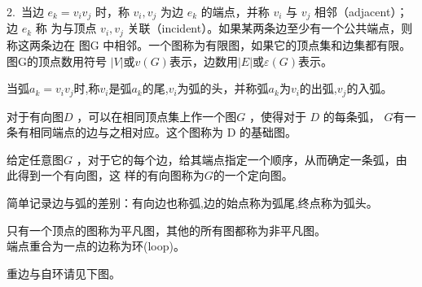 \documentclass[a4paper,20pt]{article}
\begin{document}
\par 2.~当边 $e_k=v_iv_j$ 时，称 $v_i,v_j$ 为边 $e_k$ 的端点，并称 $v_i$ 与 $v_j$ 相邻（adjacent）；边 $e_k$ 称
为与顶点 $v_i,v_j$ 关联（incident）。如果某两条边至少有一个公共端点，则称这两条边在
图G 中相邻。一个图称为有限图，如果它的顶点集和边集都有限。图G的顶点数用符号
$|V|$或$v(G)$表示，边数用$|E|$或$\varepsilon (G)$表示。
\par 当弧$a_k=v_iv_j$时,称$v_i$是弧$a_k$的尾,$v_i$为弧的头，并称弧$a_k$为$v_i$的出弧,$v_j$的入弧。
\par 对于有向图$D$ ，可以在相同顶点集上作一个图$G$ ，使得对于 $D$ 的每条弧，
$G $有一条有相同端点的边与之相对应。这个图称为 D 的基础图。
\par 给定任意图$G$ ，对于它的每个边，给其端点指定一个顺序，从而确定一条弧，由此得到一个有向图，这
样的有向图称为$G $的一个定向图。
\par 简单记录边与弧的差别：有向边也称弧,边的始点称为弧尾,终点称为弧头。
\par 只有一个顶点的图称为平凡图，其他的所有图都称为非平凡图。
\\端点重合为一点的边称为环(loop)。
\par \noindent 重边与自环请见下图。
\end{document}
